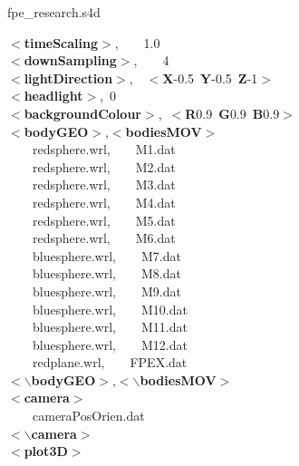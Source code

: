 \documentclass[singlecolumn,12pt]{article}
\newcommand{\hlstd}[1]{\textcolor[rgb]{0,0,0}{#1}}
\newcommand{\hlkey}[1]{\textcolor[rgb]{0,0,1}{\bf{#1}}}
\newcommand{\hlnum}[1]{\textcolor[rgb]{0.66,0,0.66}{#1}}
\begin{document}
\newpage
fpe\_research.s4d

\begin{landscape}
\noindent \ttfamily \footnotesize
\hlstd{}\hlkey{$<$timeScaling$>$}\hlstd{,\hlstd{\ \ \ \ }}\hlnum{1.0\\
}\hlstd{}\hlkey{$<$downSampling$>$}\hlstd{,\hlstd{\ \ \ \ }}\hlnum{4\\
}\hlstd{}\hlkey{$<$lightDirection$>$}\hlstd{,\hlstd{\ \ }}\hlkey{$<$X}\hlnum{-0.5\ }\hlkey{Y}\hlnum{-0.5\ }\hlkey{Z}\hlnum{-1}\hlkey{$>$}\hlstd{\\
}\hlkey{$<$headlight$>$}\hlstd{,\ }\hlnum{0\\
}\hlstd{}\hlkey{$<$backgroundColour$>$}\hlstd{,\ }\hlkey{$<$R}\hlnum{0.9\ }\hlkey{G}\hlnum{0.9\ }\hlkey{B}\hlnum{0.9}\hlkey{$>$}\hlstd{\\
}\hlkey{$<$bodyGEO$>$}\hlstd{,}\hlkey{$<$bodiesMOV$>$}\hlstd{\\
\hlstd{\ \ \ \ }redsphere.wrl,\hlstd{\ \ \ \ }M1.dat\\
\hlstd{\ \ \ \ }redsphere.wrl,\hlstd{\ \ \ \ }M2.dat\\
\hlstd{\ \ \ \ }redsphere.wrl,\hlstd{\ \ \ \ }M3.dat\\
\hlstd{\ \ \ \ }redsphere.wrl,\hlstd{\ \ \ \ }M4.dat\\
\hlstd{\ \ \ \ }redsphere.wrl,\hlstd{\ \ \ \ }M5.dat\\
\hlstd{\ \ \ \ }redsphere.wrl,\hlstd{\ \ \ \ }M6.dat\\
\hlstd{\ \ \ \ }bluesphere.wrl,\hlstd{\ \ \ \ }M7.dat\\
\hlstd{\ \ \ \ }bluesphere.wrl,\hlstd{\ \ \ \ }M8.dat\\
\hlstd{\ \ \ \ }bluesphere.wrl,\hlstd{\ \ \ \ }M9.dat\\
\hlstd{\ \ \ \ }bluesphere.wrl,\hlstd{\ \ \ \ }M10.dat\\
\hlstd{\ \ \ \ }bluesphere.wrl,\hlstd{\ \ \ \ }M11.dat\\
\hlstd{\ \ \ \ }bluesphere.wrl,\hlstd{\ \ \ \ }M12.dat\\
\hlstd{\ \ \ \ }redplane.wrl,\hlstd{\ \ \ \ }FPEX.dat\\
}\hlkey{$<$$\backslash$bodyGEO$>$}\hlstd{,}\hlkey{$<$$\backslash$bodiesMOV$>$}\hlstd{\\
}\hlkey{$<$camera$>$}\hlstd{\\
\hlstd{\ \ \ \ }cameraPosOrien.dat\\
}\hlkey{$<$$\backslash$camera$>$}\hlstd{\\
}\hlkey{$<$plot3D$>$}\hlstd{\\
}
\end{landscape}
\end{document}
